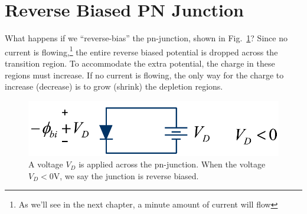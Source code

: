 \section{Reverse Biased PN Junction}
What happens if we “reverse-bias” the pn-junction, shown in Fig.~\ref{fig:slide28}?  Since no current is flowing,\footnote{As we'll see in the next chapter, a minute amount of current will flow} the entire reverse biased potential is dropped across the transition region.   To accommodate the extra potential, the charge in these regions must increase.   If no current is flowing, the only way for the charge to increase (decrease) is to grow (shrink) the depletion regions.
\begin{figure}[tb]
\begin{center}
\includegraphics[width=.5\columnwidth]{slide28}
\end{center}
\caption{A voltage $V_D$ is applied across the pn-junction.  When the voltage $V_D < 0$V, we say the junction is reverse biased.}
\label{fig:slide28}
\end{figure}

